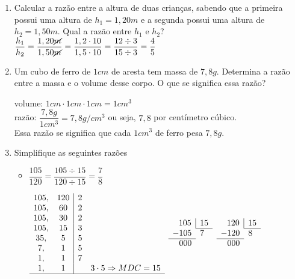 \begin{enumerate}
	\item Calcular a razão entre a altura de duas crianças, sabendo que a primeira possui uma altura de $h_1 = 1,20m$ e a segunda possui uma altura de $h_2 = 1,50m$. Qual a razão entre $h_1$ e $h_2$? \\
	
	$\dfrac{h_1}{h_2} = \dfrac{1,20\cancel{m}}{1,50\cancel{m}} = \dfrac{1,2 \cdot 10}{1,5  \cdot 10} = \dfrac{12 \div 3}{15 \div 3} = \dfrac{4}{5}$\\
	
	\item Um cubo de ferro de $1cm$ de aresta tem massa de $7,8g$. Determina a razão entre a massa e o volume desse corpo. O que se significa essa razão?
	
	volume: $1cm \cdot 1cm \cdot 1cm = 1cm^3$\\
	
	razão: $ \dfrac{7,8g}{1cm^3} = 7,8g/cm^3$ ou seja, $ 7,8 $ por centímetro cúbico.\\
	
	Essa razão se significa que cada $ 1cm^3 $ de ferro pesa $ 7,8g $.\\
	
	\item Simplifique as seguintes razões
	
	\begin{itemize}		
		
		\item $\dfrac{105}{120} = \dfrac{105 \div 15}{120 \div 15} = \dfrac{7}{8}$\\	
		\begin{multicols}{3}
		$\begin{array}{cc|cc}
		105, & 120 & 2 & \\ 
		105, & 60 & 2 & \\ 
		105, & 30 & 2 & \\
		105, & 15 & 3 & \\
		35, & 5 & 5 & \\
		7, & 1 & 5 & \\
		1, & 1 & 7 & \\
		1, & 1 &  & 3 \cdot 5 \Rightarrow MDC = 15 \\
		\hline 
		\end{array}
		$
		\columnbreak
		$
		\begin{array}{r l r r}
		\multicolumn{2}{r}{105} \vline & \multicolumn{2}{l}{15} \\ \cline{3-4}
		\multicolumn{2}{l}{-105} & \multicolumn{2}{l}{7} \\ \cline{1-2}
		\multicolumn{2}{r}{000} &  \\
		\end{array}
		$
		\columnbreak
		$
		\begin{array}{l l r r}
		\multicolumn{2}{r}{120} \vline & \multicolumn{2}{l}{15} \\ \cline{3-4}
		\multicolumn{2}{l}{-120} & \multicolumn{2}{l}{8} \\ \cline{1-2}
		\multicolumn{2}{r}{000} &  \\
		\end{array}
		$
	\end{multicols}


\end{itemize}
\end{enumerate}
